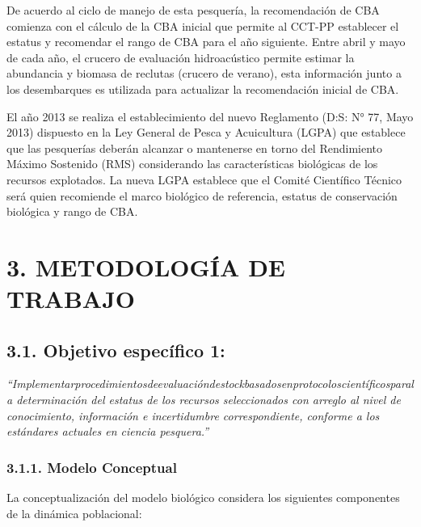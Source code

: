 \documentclass[
  spanish,
]{article}
\begin{document}
De acuerdo al ciclo de manejo de esta pesquería, la recomendación de CBA
comienza con el cálculo de la CBA inicial que permite al CCT-PP
establecer el estatus y recomendar el rango de CBA para el año
siguiente. Entre abril y mayo de cada año, el crucero de evaluación
hidroacústico permite estimar la abundancia y biomasa de reclutas
(crucero de verano), esta información junto a los desembarques es
utilizada para actualizar la recomendación inicial de CBA.

El año 2013 se realiza el establecimiento del nuevo Reglamento (D:S: N°
77, Mayo 2013) dispuesto en la Ley General de Pesca y Acuicultura (LGPA)
que establece que las pesquerías deberán alcanzar o mantenerse en torno
del Rendimiento Máximo Sostenido (RMS) considerando las características
biológicas de los recursos explotados. La nueva LGPA establece que el
Comité Científico Técnico será quien recomiende el marco biológico de
referencia, estatus de conservación biológica y rango de CBA.

\pagebreak
\normalsize

\hypertarget{metodologuxeda-de-trabajo}{%
\section{3. METODOLOGÍA DE TRABAJO}\label{metodologuxeda-de-trabajo}}

\hypertarget{objetivo-especuxedfico-1}{%
\subsection{3.1. Objetivo específico
1:}\label{objetivo-especuxedfico-1}}

\vspace{-0.2cm}

\emph{``Implementarprocedimientosdeevaluacióndestockbasadosenprotocoloscientíficosparala
determinación del estatus de los recursos seleccionados con arreglo al
nivel de conocimiento, información e incertidumbre correspondiente,
conforme a los estándares actuales en ciencia pesquera.''}
\vspace{0.5cm}

\hypertarget{modelo-conceptual}{%
\subsubsection{3.1.1. Modelo Conceptual}\label{modelo-conceptual}}

La conceptualización del modelo biológico considera los siguientes
componentes de la dinámica poblacional:
\end{document}
